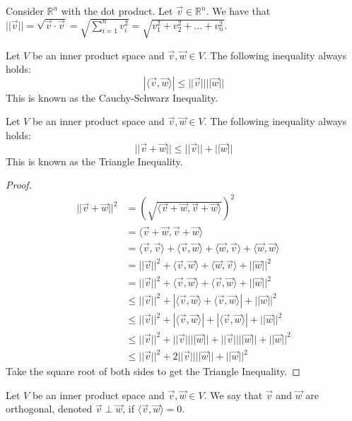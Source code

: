 \begin{example}
    Consider $\mathbb{R}^n$ with the dot product. Let $\vec{v}\in\mathbb{R}^n$. We have that $||\vec{v}||=\sqrt{\vec{v}\cdot\vec{v}}=\sqrt{\sum_{i=1}^n v_i^2}=\sqrt{v_1^2+v_2^2+\ldots+v_n^2}$.
\end{example}
\begin{theorem}
    Let $V$ be an inner product space and $\vec{v},\vec{w}\in V$. The following inequality always holds:
    $$|\langle\vec{v},\vec{w}\rangle|\leq||\vec{v}||||\vec{w}||$$
    This is known as the Cauchy-Schwarz Inequality.
\end{theorem}
\begin{theorem}
    Let $V$ be an inner product space and $\vec{v},\vec{w}\in V$. The following inequality always holds:
    $$||\vec{v}+\vec{w}||\leq||\vec{v}||+||\vec{w}||$$
    This is known as the Triangle Inequality.
\end{theorem}
\begin{proof}
    \begin{align*}
        ||\vec{v}+\vec{w}||^2&=(\sqrt{\langle\vec{v}+\vec{w},\vec{v}+\vec{w}\rangle})^2\\
        &=\langle\vec{v}+\vec{w},\vec{v}+\vec{w}\rangle\\
        &=\langle\vec{v},\vec{v}\rangle+\langle\vec{v},\vec{w}\rangle+\langle\vec{w},\vec{v}\rangle+\langle\vec{w},\vec{w}\rangle\tag{by Linearity of Inner Product}\\
        &=||\vec{v}||^2+\langle\vec{v},\vec{w}\rangle+\langle\vec{w},\vec{v}\rangle+||\vec{w}||^2\\
        &=||\vec{v}||^2+\langle\vec{v},\vec{w}\rangle+\langle\vec{v},\vec{w}\rangle+||\vec{w}||^2\tag{by Symmetry of Inner Product}\\
        &\leq||\vec{v}||^2+|\langle\vec{v},\vec{w}\rangle+\langle\vec{v},\vec{w}\rangle|+||\vec{w}||^2\\
        &\leq||\vec{v}||^2+|\langle\vec{v},\vec{w}\rangle|+|\langle\vec{v},\vec{w}\rangle|+||\vec{w}||^2\\
        &\leq||\vec{v}||^2+||\vec{v}||||\vec{w}||+||\vec{v}||||\vec{w}||+||\vec{w}||^2\tag{by Cauchy Schwarz Inequality}\\
        &\leq||\vec{v}||^2+2||\vec{v}||||\vec{w}||+||\vec{w}||^2
    \end{align*}
    Take the square root of both sides to get the Triangle Inequality.
\end{proof}
\begin{definition}
    Let $V$ be an inner product space and $\vec{v},\vec{w}\in V$. We say that $\vec{v}$ and $\vec{w}$ are orthogonal, denoted $\vec{v}\perp\vec{w}$, if $\langle\vec{v},\vec{w}\rangle=0$.
\end{definition}
